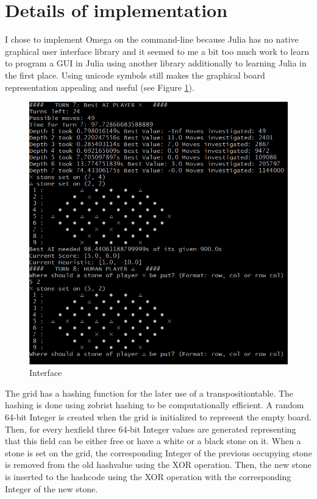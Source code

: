 \documentclass[a4paper]{article}
\begin{document}
\section{Details of implementation}
I chose to implement Omega on the command-line because Julia has no native graphical user interface library and it seemed to me a bit too much work to learn to program a GUI in Julia using another library additionally to learning Julia in the first place. Using unicode symbols still makes the graphical board representation appealing and useful (see Figure \ref{interface}).

\begin{figure}
\includegraphics[scale=0.5]{"Sample interface"}
\caption{Interface}
\label{interface}
\end{figure}


The grid has a hashing function for the later use of a transpositiontable. The hashing is done using zobrist hashing \cite{zobrist1970new} to be computationally efficient. A random 64-bit Integer is created when the grid is initialized to represent the empty board. Then, for every hexfield three 64-bit Integer values are generated representing that this field can be either free or have a white or a black stone on it. When a stone is set on the grid, the corresponding Integer of the previous occupying stone is removed from the old hashvalue using the XOR operation. Then, the new stone is inserted to the hashcode using the XOR operation with the corresponding Integer of the new stone.
\end{document}
